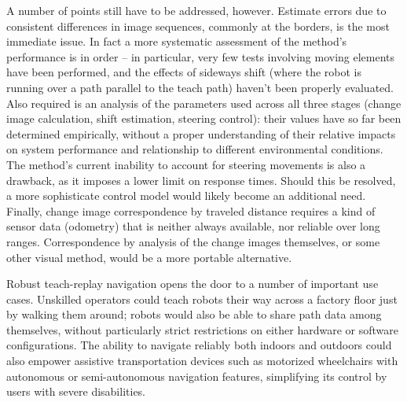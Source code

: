 \documentclass[twocolumn, 9pt,fleqn]{jsproceedings}
\begin{document}
A number of points still have to be addressed, however. Estimate errors due to consistent differences in image sequences, commonly at the borders, is the most immediate issue. In fact a more systematic assessment of the method's performance is in order -- in particular, very few tests involving moving elements have been performed, and the effects of sideways shift (where the robot is running over a path parallel to the teach path) haven't been properly evaluated. Also required is an analysis of the parameters used across all three stages (change image calculation, shift estimation, steering control): their values have so far been determined empirically, without a proper understanding of their relative impacts on system performance and relationship to different environmental conditions. The method's current inability to account for steering movements is also a drawback, as it imposes a lower limit on response times. Should this be resolved, a more sophisticate control model would likely become an additional need. Finally, change image correspondence by traveled distance requires a kind of sensor data (odometry) that is neither always available, nor reliable over long ranges. Correspondence by analysis of the change images themselves, or some other visual method, would be a more portable alternative.

Robust teach-replay navigation opens the door to a number of important use cases. Unskilled operators could teach robots their way across a factory floor just by walking them around; robots would also be able to share path data among themselves, without particularly strict restrictions on either hardware or software configurations. The ability to navigate reliably both indoors and outdoors could also empower assistive transportation devices such as motorized wheelchairs with autonomous or semi-autonomous navigation features, simplifying its control by users with severe disabilities.

\footnotesize




\normalsize
\end{document}
